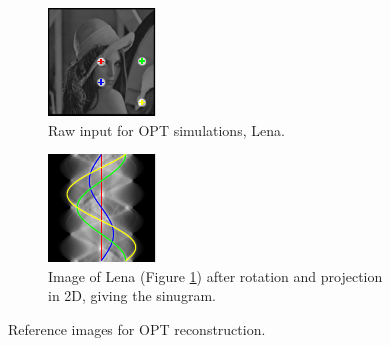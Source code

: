 \begin{figure}
  \centering
  \hfill
  \begin{subfigure}[t]{0.3\textwidth}
    \includegraphics[width=\textwidth]{Chapters/flopt/Figs/PDF/results/no_helix/rawinput_colour}
    \caption{Raw input for OPT simulations, Lena.}
    \label{fig:raw_input}
  \end{subfigure}\hfill
  \begin{subfigure}[t]{0.3\textwidth}
    \includegraphics[width=\textwidth]{Chapters/flopt/Figs/PDF/results/no_helix/sinugram_stretch}
    \caption{Image of Lena (Figure \ref{fig:raw_input}) after rotation and projection in 2D, giving the sinugram.}
    \label{fig:sinugram}
  \end{subfigure}
  \hfill
  \label{fig:rawinputs}
  \caption{Reference images for OPT reconstruction.}
\end{figure}

